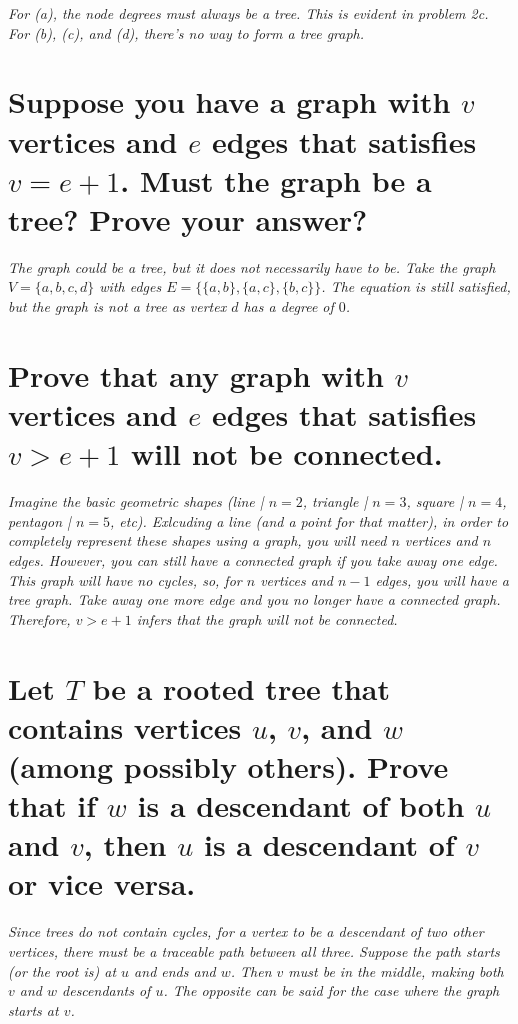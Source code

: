 \documentclass{article}
\begin{document}
\textit{For (a), the node degrees must always be a tree. This is evident in problem 2c. For (b), (c), and (d), there's no way to form a tree graph.}


\section{Suppose you have a graph with $v$ vertices and $e$ edges that satisfies $v=e+1$. Must the graph be a tree? Prove your answer?}
\textit{The graph could be a tree, but it does not necessarily have to be. Take the graph $V=\{a,b,c,d\}$ with edges $E=\{\{a,b\},\{a,c\},\{b,c\}\}$. The equation is still satisfied, but the graph is not a tree as vertex $d$ has a degree of $0$.}
\clearpage


\section{Prove that any graph with $v$ vertices and $e$ edges that satisfies $v>e+1$ will not be connected.}
\hspace{1cm}\textit{Imagine the basic geometric shapes (line | $n=2$, triangle | $n=3$, square | $n=4$, pentagon | $n=5$, etc). Exlcuding a line (and a point for that matter), in order to completely represent these shapes using a graph, you will need $n$ vertices and $n$ edges. However, you can still have a connected graph if you take away one edge. This graph will have no cycles, so, for $n$ vertices and $n-1$ edges, you will have a tree graph. Take away one more edge and you no longer have a connected graph. Therefore, $v>e+1$ infers that the graph will not be connected.}


\section{Let $T$ be a rooted tree that contains vertices $u$, $v$, and $w$ (among possibly others). Prove that if $w$ is a descendant of both $u$ and $v$, then $u$ is a descendant of $v$ or vice versa.}
\hspace{1cm}\textit{Since trees do not contain cycles, for a vertex to be a descendant of two other vertices, there must be a traceable path between all three. Suppose the path starts (or the root is) at $u$ and ends and $w$. Then $v$ must be in the middle, making both $v$ and $w$ descendants of $u$. The opposite can be said for the case where the graph starts at $v$.}
\end{document}

